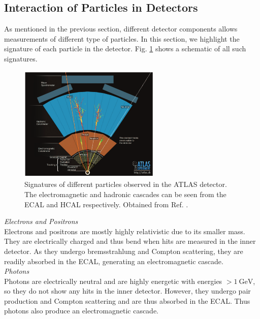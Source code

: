 \documentclass[a4paper]{report}
\numberwithin{equation}{section}
\begin{document}
\subsection{Interaction of Particles in Detectors}

As mentioned in the previous section, different detector components allows measurements of different type of particles. In this 
section, we highlight the signature of each particle in the detector. Fig. \ref{fig:detector_signatures} shows a schematic of all such signatures. 

\begin{figure}[htpb]
    \centering
    \includegraphics[width=0.6\textwidth]{detector_signatures.png}
    \caption{Signatures of different particles observed in the ATLAS detector. The electromagnetic and hadronic cascades can be seen from the ECAL and HCAL 
	respectively. Obtained from Ref. \cite{Gerber2019}. }
    \label{fig:detector_signatures}
\end{figure}
\bigbreak
\noindent \textit{Electrons and Positrons} \\ 

Electrons and positrons are mostly highly relativistic due to its smaller mass. They are electrically charged and thus bend when 
hits are measured in the inner detector. As they undergo bremsstrahlung and Compton scattering, they are readily absorbed in the ECAL, 
generating an electromagnetic cascade. \\

\noindent \textit{Photons} \\

Photons are electrically neutral and are highly energetic with energies $> \SI{1}{\giga\electronvolt}$, so they do not show any hits
 in the inner detector. However, they undergo pair production and Compton scattering and are thus absorbed in the ECAL. Thus photons 
 also produce an electromagnetic cascade. \\
\end{document}
